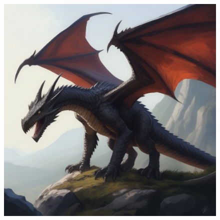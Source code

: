 


\begin{figure}[h]
\begin{center}
\includegraphics[scale=0.24]{img/ai-images/dragon.png}
\end{center}
\end{figure}
